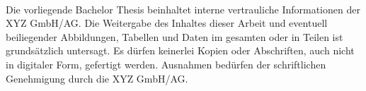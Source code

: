 \\
Die vorliegende Bachelor Thesis beinhaltet interne vertrauliche Informationen der XYZ GmbH/AG. Die Weitergabe des Inhaltes dieser Arbeit und eventuell beiliegender Abbildungen, Tabellen und Daten im gesamten oder in Teilen ist grundsätzlich untersagt. Es dürfen keinerlei Kopien oder Abschriften, auch nicht in digitaler Form, gefertigt werden. Ausnahmen bedürfen der schriftlichen Genehmigung durch die XYZ GmbH/AG. 
\newpage